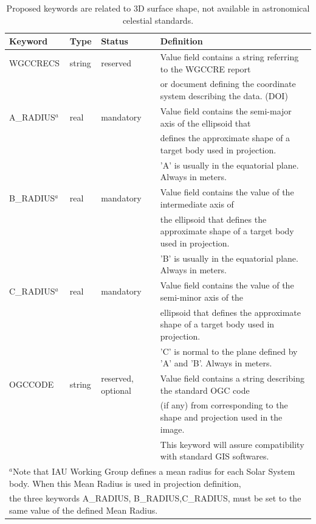 \begin{table}
\label{table:newkeys}
\caption{Proposed keywords are related to 3D surface shape,
not available in astronomical celestial standards.}
\centering
\begin{tabular}{l l l l}
\hline
Keyword & Type & Status & Definition  \\
\hline
WGCCRECS & string & reserved & Value field contains a string referring to the WGCCRE report \\
& & & or document defining the coordinate system describing the data. (DOI)    \\
A\_RADIUS$^{a}$ & real & mandatory & Value field contains the semi-major axis of the ellipsoid that \\
& & & defines the approximate shape of a target body used in projection. \\
& & & 'A' is usually in the equatorial plane. Always in meters.  \\
B\_RADIUS$^{a}$ & real & mandatory & Value field contains the value of the intermediate axis of \\
& & & the ellipsoid that defines the approximate shape of a target body used in projection. \\
& & & 'B' is usually in the equatorial plane. Always in meters.   \\
C\_RADIUS$^{a}$ & real & mandatory & Value field contains the value of the semi-minor axis of the \\
& & & ellipsoid that defines the approximate shape of a target body used in projection. \\
& & & 'C' is normal to the plane defined by 'A' and 'B'. Always in meters. \\
OGCCODE	& string & reserved, optional & Value field contains a string describing the standard OGC code \\
& & & (if any) from \citet{hare2006} corresponding to the shape and projection used in the image. \\
& & & This keyword will assure compatibility with standard GIS softwares. \\
\hline
\multicolumn{4}{l}{$^{a}$Note that IAU Working Group defines a mean radius for each Solar System body. When this Mean Radius is used in projection definition,} \\
\multicolumn{4}{l}{  the three keywords A\_RADIUS, B\_RADIUS,C\_RADIUS, must be set to the same value of the defined Mean Radius.} \\
\end{tabular}
\end{table}

